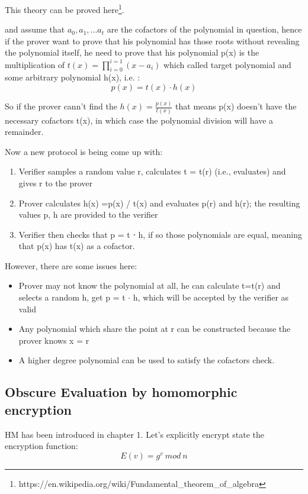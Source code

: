 \documentclass[a4paper,11pt]{article}
\begin{document}
This theory can be proved here\footnote{https://en.wikipedia.org/wiki/Fundamental\_theorem\_of\_algebra}.

and assume that $a_0, a_1, ... a_t$ are the cofactors of the polynomial in question, hence if the prover want to prove that his polynomial has those roots without revealing the polynomial itself, he need to prove that 
his polynomial p(x) is the multiplication of $t(x) = \prod_{i=0}^{i=1}(x-a_i)$ which called target polynomial and some arbitrary polynomial h(x), i.e. :
\begin{equation}
p(x) = t(x) \cdot h(x)
\end{equation}

So if the prover cann't find the $h(x) = \frac{p(x)}{t(x)}$ that means p(x) doesn't have the necessary cofactors t(x), in which case the polynomial division will have a remainder. 

Now a new protocol is being come up with:
\begin{enumerate}
\item Verifier samples a random value r, calculates t = t(r) (i.e., evaluates) and gives r to the prover
\item Prover calculates h(x) =p(x) / t(x) and evaluates p(r) and h(r); the resulting values p, h are provided to the verifier
\item Verifier then checks that p = t ⋅ h, if so those polynomials are equal, meaning that p(x) has t(x) as a cofactor.
\end{enumerate}


However, there are some issues here:
\begin{itemize}
\item Prover may not know the polynomial at all, he can calculate t=t(r) and selects a random h, get p = t $\cdot$ h, which will be accepted by the verifier as valid
\item Any polynomial which share the point at r can be constructed because the prover knows x = r 
\item A higher degree polynomial can be used to satisfy the cofactors check.
\end{itemize}

\subsection{Obscure Evaluation by homomorphic encryption}
HM has been introduced in chapter 1.  Let's explicitly encrypt state the encryption function:
\begin{equation}
E(v) = g^v\ mod\ n 
\end{equation}
\end{document}
